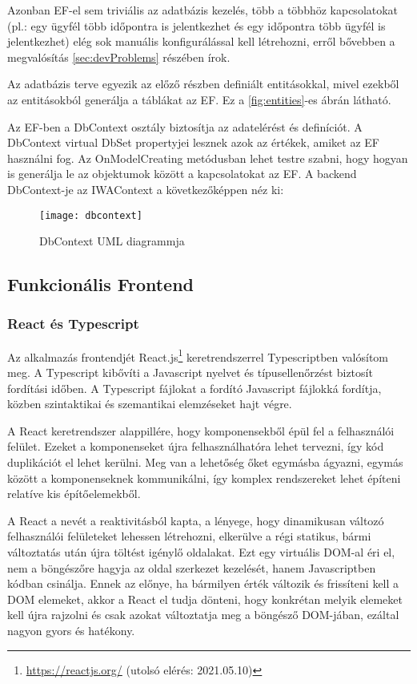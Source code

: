 Azonban EF-el sem triviális az adatbázis kezelés, több a többhöz kapcsolatokat (pl.: egy ügyfél több időpontra is jelentkezhet és egy időpontra több ügyfél is jelentkezhet) elég sok manuális konfigurálással kell létrehozni, erről bővebben a megvalósítás \ref{sec:devProblems} részében írok.

Az adatbázis terve egyezik az előző részben definiált entitásokkal, mivel ezekből az entitásokból generálja a táblákat az EF. Ez a \ref{fig:entities}-es ábrán látható.

Az EF-ben a DbContext osztály biztosítja az adatelérést és definíciót. A DbContext virtual DbSet propertyjei lesznek azok az értékek, amiket az EF használni fog. Az OnModelCreating metódusban lehet testre szabni, hogy hogyan is generálja le az objektumok között a kapcsolatokat az EF. A backend DbContext-je az IWAContext a következőképpen néz ki:

\begin{figure}[H]
	\centering
	\texttt{[image: dbcontext]}
	\caption{DbContext UML diagrammja}
	\label{fig:dbcontext}
\end{figure}


\subsection{Funkcionális Frontend}
\subsubsection{React és Typescript}

Az alkalmazás frontendjét React.js\footnote{\url{https://reactjs.org/} (utolsó elérés: 2021.05.10)} keretrendszerrel Typescriptben valósítom meg. A Typescript kibővíti a Javascript nyelvet és típusellenőrzést biztosít fordítási időben. A Typescript fájlokat a fordító Javascript fájlokká fordítja, közben szintaktikai és szemantikai elemzéseket hajt végre.

A React keretrendszer alappillére, hogy komponensekből épül fel a felhasználói felület. Ezeket a komponenseket újra felhasználhatóra lehet tervezni, így kód duplikációt el lehet kerülni. Meg van a lehetőség őket egymásba ágyazni, egymás között a komponenseknek kommunikálni, így komplex rendszereket lehet építeni relatíve kis építőelemekből.

A React a nevét a reaktivitásból kapta, a lényege, hogy dinamikusan változó felhasználói felületeket lehessen létrehozni, elkerülve a régi statikus, bármi változtatás után újra töltést igénylő oldalakat. Ezt egy virtuális DOM-al éri el, nem a böngészőre hagyja az oldal szerkezet kezelését, hanem Javascriptben kódban csinálja. Ennek az előnye, ha bármilyen érték változik és frissíteni kell a DOM elemeket, akkor a React el tudja dönteni, hogy konkrétan melyik elemeket kell újra rajzolni és csak azokat változtatja meg a böngésző DOM-jában, ezáltal nagyon gyors és hatékony.

